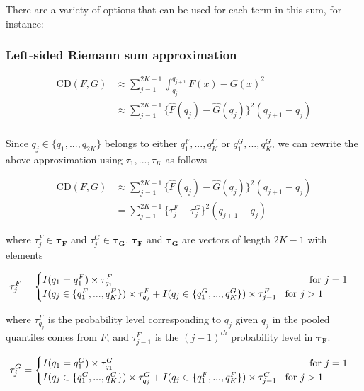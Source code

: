 \documentclass[
]{article}
\begin{document}
There are a variety of options that can be used for each term in this
sum, for instance:

\hypertarget{left-sided-riemann-sum-approximation}{%
\subsubsection{Left-sided Riemann sum
approximation}\label{left-sided-riemann-sum-approximation}}

\begin{align}
\text{CD}(F,G) &\approx\sum^{2K-1}_{j=1}\int^{q_{j+1}}_{q_j}{F(x)−G(x)}^2\\
&\approx\sum^{2K-1}_{j=1}\{\hat{F}(q_j)-\hat{G}(q_j)\}^2(q_{j+1}-q_{j})\\
\end{align}

Since \(q_j\in \{q_1, ..., q_{2K}\}\) belongs to either
\(q_{1}^F,...,q_{K}^F\) or \(q_{1}^G,...,q_{K}^G\), we can rewrite the
above approximation using \(\tau_1,...,\tau_K\) as follows

\begin{align}
\text{CD}(F,G) 
&\approx\sum^{2K-1}_{j=1}\{\hat{F}(q_j)-\hat{G}(q_j)\}^2(q_{j+1}-q_{j})\\
&=\sum^{2K-1}_{j=1}\{\tau^F_j-\tau^G_j\}^2(q_{j+1}-q_{j})
\end{align}

where \(\tau^F_j \in \boldsymbol{\tau_F}\) and
\(\tau^G_j \in \boldsymbol{\tau_G}\). \(\boldsymbol{\tau_F}\) and
\(\boldsymbol{\tau_G}\) are vectors of length \(2K-1\) with elements

\[
\tau^F_j=
\begin{cases}
I(q_1=q_1^F)\times \tau_{q_1}^F\hspace{7cm}\text{for }j=1\\
I(q_j\in \{q_1^F, ..., q_{K}^F\})\times \tau_{q_j}^F+I(q_j\in \{q_1^G, ..., q_{K}^G\})\times \tau_{j-1}^F\hspace{0.3cm}\text{for }j>1\\
\end{cases}
\]

where \(\tau_{q_j}^F\) is the probability level corresponding to \(q_j\)
given \(q_j\) in the pooled quantiles comes from \(F\), and
\(\tau_{j-1}^F\) is the \((j-1)^{th}\) probability level in
\(\boldsymbol{\tau_F}\).

\[
\tau^G_j=
\begin{cases}
I(q_1=q_1^G)\times \tau_{q_1}^G\hspace{7cm}\text{for }j=1\\
I(q_j\in \{q_1^G, ..., q_{K}^G\})\times \tau_{q_j}^G+I(q_j\in \{q_1^F,...,q_{K}^F\})\times \tau_{j-1}^G\hspace{0.3cm}\text{for }j>1\\
\end{cases}
\]
\end{document}
